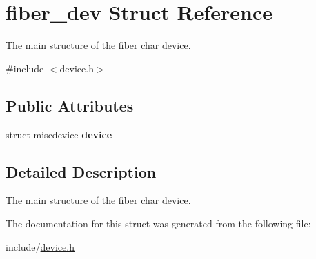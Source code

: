 \hypertarget{structfiber__dev}{}\section{fiber\+\_\+dev Struct Reference}
\label{structfiber__dev}


The main structure of the fiber char device.  




{\ttfamily \#include $<$device.\+h$>$}

\subsection*{Public Attributes}
\begin{DoxyCompactItemize}
\item 
\mbox{\label{structfiber__dev_ab886dc5f56901d33b28f4dc75478aa27}} 
struct miscdevice {\bfseries device}
\end{DoxyCompactItemize}


\subsection{Detailed Description}
The main structure of the fiber char device. 

The documentation for this struct was generated from the following file\+:\begin{DoxyCompactItemize}
\item 
include/\mbox{\hyperlink{device_8h}{device.\+h}}\end{DoxyCompactItemize}
